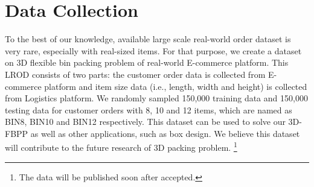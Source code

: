 \section{Data Collection}
\label{sec:data}

To the best of our knowledge, available large scale real-world order dataset is very rare, especially with real-sized items. For that purpose, we create a dataset on 3D flexible bin packing problem of real-world E-commerce platform. This LROD consists of two parts: the customer order data is collected from E-commerce platform and item size data (i.e., length, width and height) is collected from Logistics platform. We randomly sampled 150,000 training data and 150,000 testing data for customer orders with 8, 10 and 12 items, which are named as BIN8, BIN10 and BIN12 respectively. This dataset can be used to solve our 3D-FBPP as well as other applications, such as box design. We believe this dataset will contribute to the future research of 3D packing problem. \footnote{The data will be published soon after accepted.}
